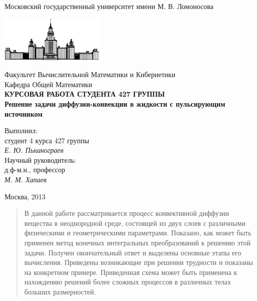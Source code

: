 \documentclass[12pt, a4paper]{article}
\begin{document}
\begin{titlepage}
\begin{center}
    Московский государственный университет имени М. В. Ломоносова

    \bigskip
    \includegraphics[width=50mm]{msu.eps}

    \bigskip
    Факультет Вычислительной Математики и Кибернетики\\
    Кафедра Общей Математики\\[10mm]

    \textsf{\large\bfseries
        КУРСОВАЯ РАБОТА СТУДЕНТА 427 ГРУППЫ\\[10mm]
        Решение задачи диффузии-конвекции в жидкости с пульсирующим источником
    }\\[10mm]

    \begin{flushright}
        \parbox{0.5\textwidth}{
            Выполнил:\\
            студент 4 курса 427 группы\\
            \emph{Е. Ю. Пышнограев}\\[5mm]
            Научный руководитель:\\
            д.ф-м.н., профессор\\
            \emph{М. М. Хапаев}
        }
    \end{flushright}

    \vspace{\fill}
    Москва, 2013
\end{center}
\end{titlepage}

\newpage
\begin{abstract}
  В данной работе рассматривается процесс конвективной диффузии вещества в неоднородной среде, состоящей из двух слоев с различными
  физическими и геометрическими параметрами. Показано, как может быть применен метод конечных интегральных преобразований к решению этой задачи.
  Получен окончательный ответ и выделены основные этапы его вычисления. Приведены возникающие при решении трудности и показаны
  на конкретном примере. Приведенная схема может быть применена к нахождению решений более сложных процессов в различных телах больших размерностей.
\end{abstract}
\end{document}
